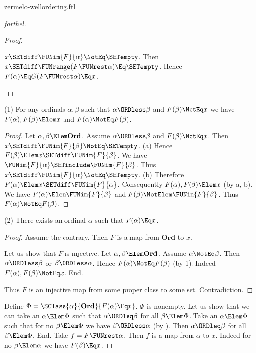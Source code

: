 \documentclass{stex}
\newcommand\Ord{\textbf{Ord}}
\begin{document}
\begin{smodule}{zermelo-wellordering.ftl}
\begin{proof}[forthel]
\begin{proof}
    \begin{case}{$x \SETdiff \FUNim{F}{\alpha} \NotEq \SETempty$.}
      Then $x \SETdiff \FUNrange(F \FUNrest \alpha) \Eq \SETempty$.
      Hence $F(\alpha)
        \Eq G(F \FUNrest \alpha)
        \Eq x$.
    \end{case}
  \end{proof}

  (1) For any ordinals $\alpha, \beta$ such that $\alpha \ORDless \beta$ and $F(\beta) \NotEq x$ we have $F(\alpha), F(\beta) \Elem x$ and $F(\alpha) \NotEq F(\beta)$.
  \begin{proof}
    Let $\alpha, \beta \Elem \Ord$.
    Assume $\alpha \ORDless \beta$ and $F(\beta) \NotEq x$.
    Then $x \SETdiff \FUNim{F}{\beta} \NotEq \SETempty$.
    (a) Hence $F(\beta) \Elem x \SETdiff \FUNim{F}{\beta}$.
    We have $\FUNim{F}{\alpha} \SETinclude \FUNim{F}{\beta}$.
    Thus $x \SETdiff \FUNim{F}{\alpha} \NotEq \SETempty$.
    (b) Therefore $F(\alpha) \Elem x \SETdiff \FUNim{F}{\alpha}$.
    Consequently $F(\alpha), F(\beta) \Elem x$ (by a, b).
    We have $F(\alpha) \Elem \FUNim{F}{\beta}$ and $F(\beta) \NotElem \FUNim{F}{\beta}$.
    Thus $F(\alpha) \NotEq F(\beta)$.
  \end{proof}

  (2) There exists an ordinal $\alpha$ such that $F(\alpha) \Eq x$.
  \begin{proof}
    Assume the contrary.
    Then $F$ is a map from $\Ord$ to $x$.

    Let us show that $F$ is injective.
      Let $\alpha, \beta \Elem \Ord$.
      Assume $\alpha \NotEq \beta$.
      Then $\alpha \ORDless \beta$ or $\beta \ORDless \alpha$.
      Hence $F(\alpha) \NotEq F(\beta)$ (by 1).
      Indeed $F(\alpha), F(\beta) \NotEq x$.
    End.

    Thus $F$ is an injective map from some proper class to some set.
    Contradiction.
  \end{proof}

  Define $\Phi = \SClass{\alpha}{\Ord}{F(\alpha) \Eq x}$.
  $\Phi$ is nonempty.
  Let us show that we can take an $\alpha \Elem \Phi$ such that $\alpha \ORDleq \beta$ for all $\beta \Elem \Phi$.
    Take an $\alpha \Elem \Phi$ such that for no $\beta \Elem \Phi$ we have $\beta \ORDless \alpha$ (by ).
    Then $\alpha \ORDleq \beta$ for all $\beta \Elem \Phi$.
  End.
  Take $f = F \FUNrest \alpha$.
  Then $f$ is a map from $\alpha$ to $x$.
  Indeed for no $\beta \Elem \alpha$ we have $F(\beta) \Eq x$.


\end{proof}
\end{smodule}
\end{document}
